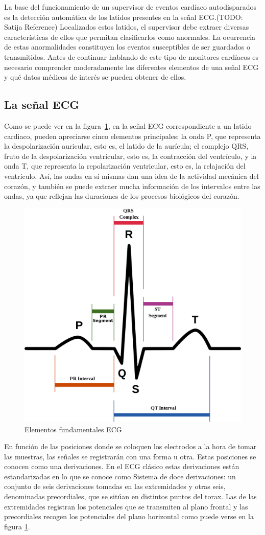 La base del funcionamiento de un supervisor de eventos cardíaco autodisparados es la detección automática de los latidos presentes en la señal ECG.(TODO: Satija Reference) Localizados estos latidos, el supervisor debe extraer diversas características de ellos que permitan clasificarlos como anormales. La ocurrencia de estas anormalidades constituyen los eventos susceptibles de ser guardados o transmitidos.  Antes de continuar hablando de este tipo de monitores cardíacos es necesario comprender moderadamente los diferentes elementos de una señal ECG y qué datos médicos de interés se pueden obtener de ellos. 

\subsection{La señal ECG}

Como se puede ver en la figura~\ref{fig:ECGelements}, en la señal ECG correspondiente a un latido cardiaco, pueden apreciarse cinco elementos principales: la onda P, que representa la despolarización auricular, esto es, el latido de la aurícula; el complejo QRS, fruto de la despolarización ventricular, esto es, la contracción del ventrículo, y la onda T, que representa la repolarización ventricular, esto es, la relajación del ventrículo. Así, las ondas en sí mismas dan una idea de la actividad mecánica del corazón, y también se puede extraer mucha información de los intervalos entre las ondas, ya que reflejan las duraciones de los procesos biológicos del corazón.

\begin{figure}[ht]  
    \centering
        \includegraphics[width =0.4\linewidth]{figuras/ECGelementsDetailed.png}
    \caption{Elementos fundamentales ECG}
    \label{fig:ECGelements}
\end{figure}

En función de las posiciones donde se coloquen los electrodos a la hora de tomar las muestras, las señales se registrarán con una forma u otra. Estas posiciones se conocen como una derivaciones. En el ECG clásico estas derivaciones están estandarizadas en lo que se conoce como Sistema de doce derivaciones: un conjunto de seis derivaciones tomadas en las extremidades y otras seis, denominadas precordiales, que se sitúan en distintos puntos del torax. Las de las extremidades registran los potenciales que se transmiten al plano frontal y las precordiales recogen los potenciales del plano horizontal como puede verse en la figura \ref{fig:ECGelements}. \cite{Harrison}

